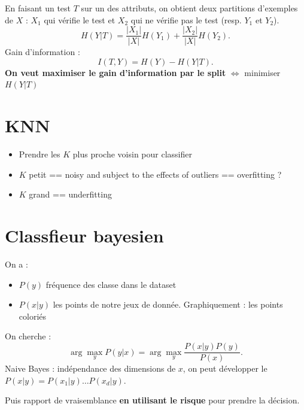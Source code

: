 \documentclass{article}
\begin{document}
\begin{multicols}{2}
\begin{defn}
    En faisant un test $T$ sur un des attributs, on obtient deux partitions d'exemples de $X$ : $X_1$ qui vérifie le test et $X_2$ qui ne vérifie pas le test (resp. $Y_1$ et $Y_2$).
    \[
        H(Y|T) = \frac{\left| X_1 \right| }{\left| X \right| } H(Y_1) + \frac{\left| X_2 \right| }{\left| X \right| } H(Y_2)
    .\]
    Gain d'information : 
    \[
        I(T, Y) = H(Y) - H(Y|T)
    .\]
    \textbf{On veut maximiser le gain d'information par le split} $ \Leftrightarrow $ minimiser $ H(Y|T) $ 
\end{defn}

\section{KNN}
\begin{itemize}
    \item Prendre les $ K $ plus proche voisin pour classifier 
    \item $ K $ petit == noisy and subject to the effects of outliers == overfitting ? 
    \item $ K $ grand == underfitting
\end{itemize}

\section{Classfieur bayesien}
On a : 
\begin{itemize}
    \item $ P(y) $ fréquence des classe dans le dataset
    \item $ P(x|y) $ les points de notre jeux de donnée. Graphiquement : les points coloriés
\end{itemize}
On cherche : 
\[
    \arg \max _y P(y|x) = \arg \max _y \frac{P(x|y) P(y)}{P(x)}
.\]
Naive Bayes : indépendance des dimensions de $ x $, on peut développer le $ P(x|y) = P(x_1|y) \dots P(x_d|y) $.

Puis rapport de vraisemblance \textbf{en utilisant le risque} pour prendre la décision.


\end{multicols}
\end{document}
